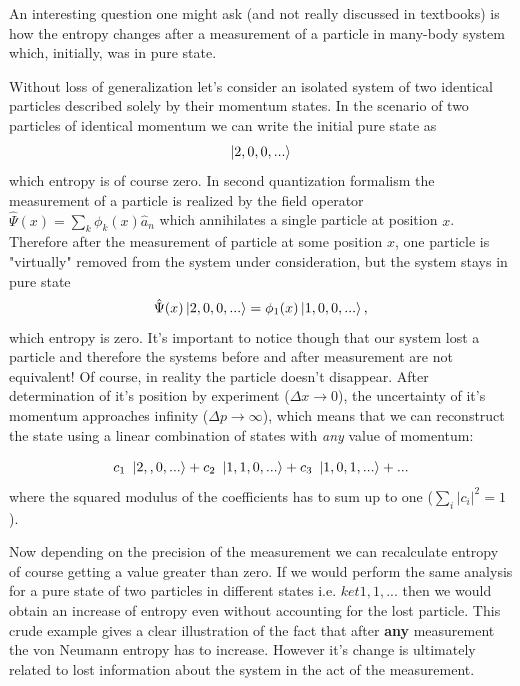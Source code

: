 \documentclass[a4paper,12pt]{article}
\begin{document}
An interesting question one might ask (and not really discussed in textbooks) is how the entropy changes after a measurement of a particle in many-body system which, initially, was in pure state.

Without loss of generalization let's consider an isolated system of two identical particles described solely by their momentum states.
In the scenario of two particles of identical momentum we can write the initial pure state as 
\begin{equation}
  \ket{2,0,0,...}
\end{equation}
which entropy is of course zero.  
In second quantization formalism the measurement of a particle is realized by the field operator $ \hat{\Psi}(x) =\sum_k \phi_k(x)\hat{a}_n$ which annihilates a single particle at position $x$.
Therefore after the measurement of particle at some position $x$, one particle is "virtually" removed from the system under consideration, but the system stays in pure state
\begin{equation}
  \hat{\Psi}(x)\ket{2,0,0,...}=\phi_1(x)\ket{1,0,0,...},
\end{equation}
which entropy is zero. It's important to notice though that our system lost a particle and therefore the systems before and after measurement are not equivalent! Of course, in reality the particle doesn't disappear. After determination of it's position by experiment ($\Delta x \to 0$), the uncertainty of it's momentum approaches infinity ($\Delta p \to \infty$), which means that we can reconstruct the state using a linear combination of states with \textit{any} value of momentum:

\begin{equation}
  c_1\ \ket{2,,0,...}+c_2\ \ket{1,1,0,...}+  c_3\ \ket{1,0,1,...}+...
\end{equation}
where the  squared modulus of the coefficients has to sum up to one ($ \sum_i \left| c_i \right|^2 = 1 $).

Now depending on the precision of the measurement we can recalculate entropy of course getting a value greater than zero. If we would perform the same analysis for a pure state of two particles in different states i.e. $ket{1,1,...}$ then we would obtain an increase of entropy even without accounting for the lost particle.
This crude example gives a clear illustration of the fact that after \textbf{any} measurement the von Neumann entropy has to increase. However it's change is ultimately related to lost information about the system in the act of the measurement.
\end{document}
